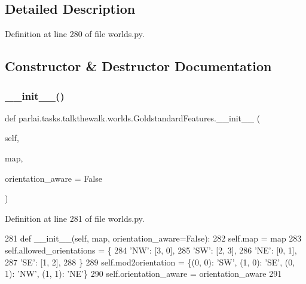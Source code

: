 \subsection{Detailed Description}


Definition at line 280 of file worlds.\+py.



\subsection{Constructor \& Destructor Documentation}
\mbox{\label{classparlai_1_1tasks_1_1talkthewalk_1_1worlds_1_1GoldstandardFeatures_ab6dbb20f1ac0881565ab51a9ab1024d3}} 
\subsubsection{\texorpdfstring{\+\_\+\+\_\+init\+\_\+\+\_\+()}{\_\_init\_\_()}}
{\footnotesize\ttfamily def parlai.\+tasks.\+talkthewalk.\+worlds.\+Goldstandard\+Features.\+\_\+\+\_\+init\+\_\+\+\_\+ (\begin{DoxyParamCaption}\item[{}]{self,  }\item[{}]{map,  }\item[{}]{orientation\+\_\+aware = {\ttfamily False} }\end{DoxyParamCaption})}



Definition at line 281 of file worlds.\+py.


\begin{DoxyCode}
281     \textcolor{keyword}{def }\_\_init\_\_(self, map, orientation\_aware=False):
282         self.map = map
283         self.allowed\_orientations = \{
284             \textcolor{stringliteral}{'NW'}: [3, 0],
285             \textcolor{stringliteral}{'SW'}: [2, 3],
286             \textcolor{stringliteral}{'NE'}: [0, 1],
287             \textcolor{stringliteral}{'SE'}: [1, 2],
288         \}
289         self.mod2orientation = \{(0, 0): \textcolor{stringliteral}{'SW'}, (1, 0): \textcolor{stringliteral}{'SE'}, (0, 1): \textcolor{stringliteral}{'NW'}, (1, 1): \textcolor{stringliteral}{'NE'}\}
290         self.orientation\_aware = orientation\_aware
291 
\end{DoxyCode}


